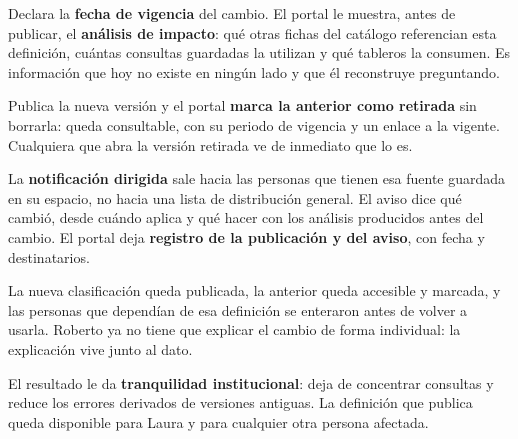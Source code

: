 Declara la \textbf{fecha de vigencia} del cambio. El portal le muestra, antes de publicar, el
\textbf{análisis de impacto}: qué otras fichas del catálogo referencian esta definición, cuántas
consultas guardadas la utilizan y qué tableros la consumen. Es información que hoy no existe en
ningún lado y que él reconstruye preguntando.

Publica la nueva versión y el portal \textbf{marca la anterior como retirada} sin borrarla: queda
consultable, con su periodo de vigencia y un enlace a la vigente. Cualquiera que abra la versión
retirada ve de inmediato que lo es.

La \textbf{notificación dirigida} sale hacia las personas que tienen esa fuente guardada en su
espacio, no hacia una lista de distribución general. El aviso dice qué cambió, desde cuándo
aplica y qué hacer con los análisis producidos antes del cambio. El portal deja
\textbf{registro de la publicación y del aviso}, con fecha y destinatarios.


La nueva clasificación queda publicada, la anterior queda accesible y marcada, y las personas
que dependían de esa definición se enteraron antes de volver a usarla. Roberto ya no tiene que
explicar el cambio de forma individual: la explicación vive junto al dato.

El resultado le da \textbf{tranquilidad institucional}: deja de concentrar consultas y reduce
los errores derivados de versiones antiguas. La definición que publica queda disponible para
Laura y para cualquier otra persona afectada.


\begin{uxlist}
\end{uxlist}

